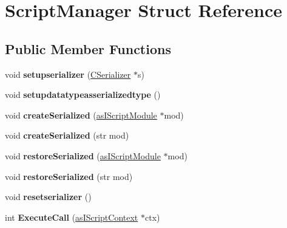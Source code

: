 \hypertarget{struct_script_manager}{}\section{Script\+Manager Struct Reference}
\label{struct_script_manager}
\subsection*{Public Member Functions}
\begin{DoxyCompactItemize}
\item 
\mbox{\label{struct_script_manager_ab14c3b3510d4f076c772fcc721dced81}} 
void {\bfseries setupserializer} (\hyperlink{class_c_serializer}{C\+Serializer} $\ast$s)
\item 
\mbox{\label{struct_script_manager_ad67ebc2c4cf245027fa0d6b970a912e3}} 
void {\bfseries setupdatatypeasserializedtype} ()
\item 
\mbox{\label{struct_script_manager_acae760bb7721bda17305de3448bb8d36}} 
void {\bfseries create\+Serialized} (\hyperlink{classas_i_script_module}{as\+I\+Script\+Module} $\ast$mod)
\item 
\mbox{\label{struct_script_manager_a47efdefd792ce1b59340838e53553693}} 
void {\bfseries create\+Serialized} (str mod)
\item 
\mbox{\label{struct_script_manager_ad45c405a1dc4e768f20979fb89d78fdd}} 
void {\bfseries restore\+Serialized} (\hyperlink{classas_i_script_module}{as\+I\+Script\+Module} $\ast$mod)
\item 
\mbox{\label{struct_script_manager_aebe4538c0774d0870612ac530a69e8e7}} 
void {\bfseries restore\+Serialized} (str mod)
\item 
\mbox{\label{struct_script_manager_a083c90c5d862920f5b3008c376985212}} 
void {\bfseries resetserializer} ()
\item 
\mbox{\label{struct_script_manager_a1c17ee2b8fd9bb3dcb0f1192a31917d1}} 
int {\bfseries Execute\+Call} (\hyperlink{classas_i_script_context}{as\+I\+Script\+Context} $\ast$ctx)

\end{DoxyCompactItemize}
